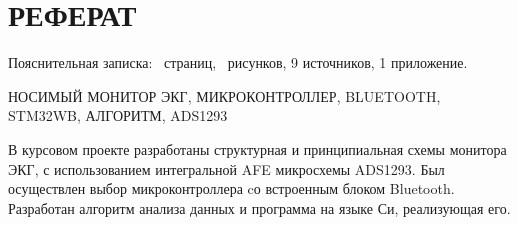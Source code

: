 \begin{sloppypar} %
\newpage %
\section*{РЕФЕРАТ} %

Пояснительная записка: \pageref*{LastPage}~страниц, \totfig~рисунков, 9 источников, 1 приложение.
 
 
 
НОСИМЫЙ МОНИТОР ЭКГ, МИКРОКОНТРОЛЛЕР, BLUETOOTH, STM32WB, АЛГОРИТМ, ADS1293


В курсовом проекте разработаны структурная и принципиальная схемы монитора ЭКГ, с использованием интегральной AFE микросхемы ADS1293. Был осуществлен выбор микроконтроллера cо встроенным блоком Bluetooth. Разработан алгоритм анализа данных и программа на языке Си, реализующая его.

\end{sloppypar}
